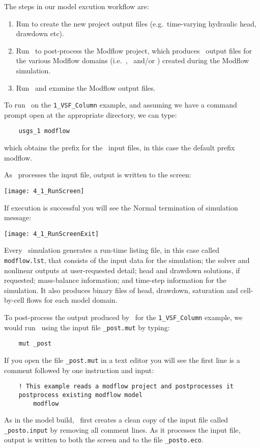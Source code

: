 \label{chapter:ModelExecution}
The steps in our model excution  workflow are:
\begin{enumerate}
    \item Run \mfus to create the new project output files (e.g.\ time-varying hydraulic head, drawdown etc).\label{step:modflow}
    \item Run \mut\ to post-process the Modflow project, which produces \tecplot\ output files for the various Modflow domains (i.e.\ \gwf, \swf\ and/or \cln ) created during the Modflow simulation.\label{step:mut2}
    \item Run \tecplot\ and examine the Modflow output files.   \label{step:Tecplot2}
\end{enumerate}

To run \mfus\ on the \texttt{1\_VSF\_Column} example, and assuming we have a command prompt open at the appropriate directory, we can type:
\begin{verbatim}
    usgs_1 modflow
\end{verbatim}
which obtains the prefix for the \mfus\ input files, in this case the default prefix {\sf modflow}.

 As \mfus\ processes the input file, output is written to the screen:

        \texttt{[image: 4\_1\_RunScreen]}

 If execution is successful you will see the {\sf Normal termination of simulation} message:

        \texttt{[image: 4\_1\_RunScreenExit]}

 Every \mfus\ simulation generates a run-time
listing file, in this case called {\tt modflow.lst}, that consists of the input data for the simulation;
the solver and nonlinear outputs at user-requested detail; head
and drawdown solutions, if requested; mass-balance information; and time-step information for the simulation.  It also produces binary files of head, drawdown, saturation and cell-by-cell flows for each model domain.

To post-process the output produced by \mfus\ for the \texttt{1\_VSF\_Column} example, we would  run \mut\ using the input file \texttt{\_post.mut} by typing:
\begin{verbatim}
    mut _post
\end{verbatim}

If you open the file \texttt{\_post.mut} in a text editor you will see the first  line is a comment followed by one instruction and input:
\squish
\begin{verbatim}
    ! This example reads a modflow project and postprocesses it
    postprocess existing modflow model
        modflow
\end{verbatim}
As in the model build, \mut\ first creates a clean copy of the input file called \texttt{\_posto.input} by removing all comment lines.
 As it processes the input file, output is written to both the screen and to the file \texttt{\_posto.eco}.

